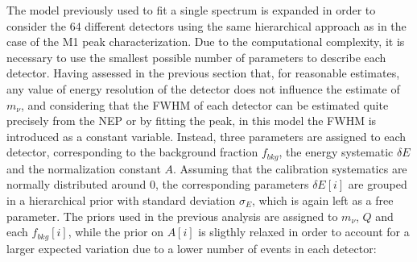 The model previously used to fit a single spectrum is expanded in order to consider the 64 different detectors using the
same hierarchical approach as in the case of the M1 peak characterization.
Due to the computational complexity, it is necessary to use the smallest possible number of parameters to describe each detector. 
Having assessed in the previous section that, for reasonable estimates, any value of energy resolution of the detector does not
influence the estimate of $m_\nu$, and considering that the FWHM of each detector can be estimated
quite precisely from the NEP or by fitting the peak, in this model the FWHM is introduced as a constant variable.
Instead, three parameters are assigned to each detector, corresponding to the background fraction $f_{bkg}$, the energy
systematic $\delta E$ and the normalization constant $A$. Assuming that the calibration systematics are normally
distributed around 0, the corresponding parameters ${\delta E[i]}$ are grouped in a hierarchical prior with standard
deviation $\sigma_E$, which is again left as a free parameter.
The priors used in the previous analysis are assigned to $m_\nu$, $Q$ and each $f_{bkg}[i]$, while the prior on $A[i]$
is
sligthly relaxed in order to account for a larger expected variation due to a lower number of events in each detector:


